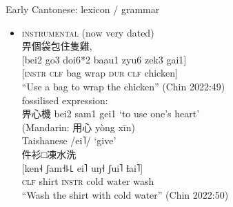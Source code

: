 \documentclass{beamer}
\begin{document}
\begin{frame}[fragile]{Early Cantonese: lexicon / grammar}

\begin{itemize}
    \item \textsc{instrumental} (now very dated)\\
     {\footnotesize 畀個袋包住隻雞,\\
    {[bei2 go3 doi6*2 baau1 zyu6 zek3 gai1]}\\
    {[\textsc{instr} \textsc{clf} bag wrap \textsc{dur} \textsc{clf} chicken]}\\
    \enquote{Use a bag to wrap the chicken} (Chin 2022:49)}\\
    \smallskip
    fossilised expression: \\畀心機 bei2 sam1 gei1 \enquote*{to use one's heart}\\ (Mandarin: 用心 yòng xīn)\\
    \medskip
    Taishanese /ei˥/ \enquote*{give}\\
      {\footnotesize 件衫□凍水洗\\
    {[ken˧˨ ʃam˧꜕꜖ ei˥ uŋ˧ ʃui˥ ɬai˥]}\\
    \textsc{clf} shirt \textsc{instr} cold water wash\\
    \enquote{Wash the shirt with cold water} (Chin 2022:50)}\\

\end{itemize}

\end{frame}
\end{document}
